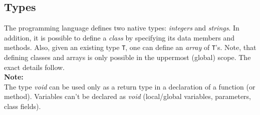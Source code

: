\documentclass{article}
\begin{document}
\subsection{Types}
The \plname programming language defines two native types: \textit{integers} and \textit{strings}.
In addition, it is possible to define a \textit{class} by specifying its data members and methods.
Also, given an existing type \verb"T", one can define an \textit{array} of \verb"T"'s.
Note, that defining classes and arrays is only possible in the uppermost (global) scope.
The exact details follow. \\
\textbf{Note:} \\
The type \textit{void} can be used only as a return type in a declaration of a function (or method).
Variables can't be declared as \textit{void} (local/global variables, parameters, class fields).

\end{document}
